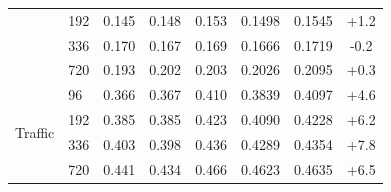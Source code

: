 \begin{tabular}{llcccccc}
 & 192 & 0.145 & 0.148 & 0.153 & 0.1498 & 0.1545 & +1.2 \\
 & 336 & 0.170 & 0.167 & 0.169 & 0.1666 & 0.1719 & -0.2 \\
 & 720 & 0.193 & 0.202 & 0.203 & 0.2026 & 0.2095 & +0.3 \\
\midrule
\multirow{4}{*}{Traffic} & 96 & 0.366 & 0.367 & 0.410 & 0.3839 & 0.4097 & +4.6 \\
 & 192 & 0.385 & 0.385 & 0.423 & 0.4090 & 0.4228 & +6.2 \\
 & 336 & 0.403 & 0.398 & 0.436 & 0.4289 & 0.4354 & +7.8 \\
 & 720 & 0.441 & 0.434 & 0.466 & 0.4623 & 0.4635 & +6.5 \\
\bottomrule
\end{tabular}
